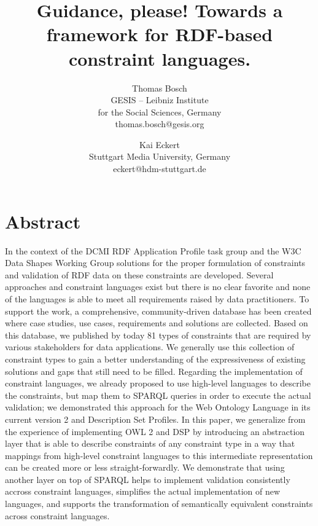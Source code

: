 \documentclass[a4paper,fontsize=11pt]{scrartcl}
\date{}
\begin{document}
\title{\vspace{-1em}Guidance, please! Towards a framework for RDF-based constraint languages.}

\author{Thomas Bosch\\GESIS – Leibniz Institute \\for the Social Sciences, Germany\\thomas.bosch@gesis.org \and Kai Eckert\\Stuttgart Media University, Germany\\eckert@hdm-stuttgart.de}

\maketitle
\vspace{-3em}
\section*{Abstract}
In the context of the DCMI RDF Application Profile task group and the W3C Data Shapes Working Group solutions for the proper formulation of constraints and validation of RDF data on these constraints are developed. Several approaches and constraint languages exist but there is no clear favorite and none of the languages is able to meet all requirements raised by data practitioners.
To support the work, a comprehensive, community-driven database has been created where case studies, use cases, requirements and solutions are collected. Based on this database,
we published by today 81 types of constraints that are required by various stakeholders for data applications. We generally use this collection of constraint types to gain a better understanding of the expressiveness of existing solutions and gaps that still need to be filled. 
Regarding the implementation of constraint languages, we already proposed to use high-level languages to describe the constraints, but map them to SPARQL queries in order to execute the actual validation; we demonstrated this approach for the Web Ontology Language in its current version 2 and Description Set Profiles.
In this paper, we generalize from the experience of implementing OWL 2 and DSP by introducing an abstraction layer that is able to describe constraints of any constraint type in a way that mappings from high-level constraint languages to this intermediate representation can be created more or less straight-forwardly. 
We demonstrate that using another layer on top of SPARQL helps to implement validation consistently accross constraint languages, simplifies the actual implementation of new languages, and supports the transformation of semantically equivalent constraints across constraint languages.
\end{document}
